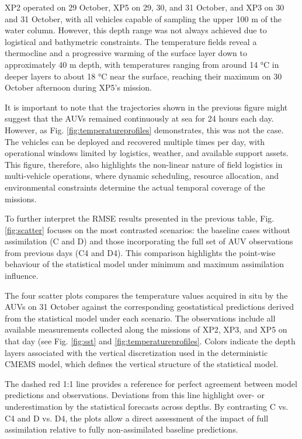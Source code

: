 XP2 operated on 29 October, XP5 on 29, 30, and 31 October, and XP3 on 30
and 31 October, with all vehicles capable of sampling the upper 100 m of
the water column. However, this depth range was not always achieved due
to logistical and bathymetric constraints. The temperature fields reveal
a thermocline and a progressive warming of the surface layer down to
approximately 40 m depth, with temperatures ranging from around 14 °C in
deeper layers to about 18 °C near the surface, reaching their maximum on
30 October afternoon during XP5’s mission.

It is important to note that the trajectories shown in the previous
figure might suggest that the AUVs remained continuously at sea for 24
hours each day. However, as Fig. \ref{fig:temperatureprofiles}
demonstrates, this was not the case. The vehicles can be deployed and
recovered multiple times per day, with operational windows limited by
logistics, weather, and available support assets. This figure,
therefore, also highlights the non-linear nature of field logistics in
multi-vehicle operations, where dynamic scheduling, resource allocation,
and environmental constraints determine the actual temporal coverage of
the missions.


To further interpret the RMSE results presented in the previous table, Fig. \ref{fig:scatter} focuses on the most contrasted scenarios: the baseline cases without assimilation (C and D) and those incorporating the full set of AUV observations from previous days (C4 and D4). This comparison highlights the point-wise behaviour of the statistical model under minimum and maximum assimilation influence.

The four scatter plots compares the temperature values acquired in situ by the AUVs on 31 October against the corresponding geostatistical predictions derived from the statistical model under each scenario. The observations include all available measurements collected along the missions of XP2, XP3, and XP5 on that day (see Fig. \ref{fig:sst} and \ref{fig:temperatureprofiles}. Colors indicate the depth layers associated with the vertical discretization used in the deterministic CMEMS model, which defines the vertical structure of the statistical model. 

The dashed red 1:1 line provides a reference for perfect agreement between model predictions and observations. Deviations from this line highlight over- or underestimation by the statistical forecasts across depths. By contrasting C vs. C4 and D vs. D4, the plots allow a direct assessment of the impact of full assimilation relative to fully non-assimilated baseline predictions.

